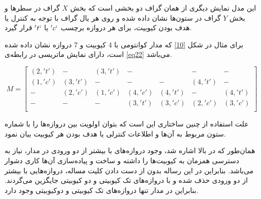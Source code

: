این مدل نمایش دیگری از همان گراف دو بخشی است که بخش $X$ گراف در سطرها و بخش $Y$ گراف در ستون‌ها نشان داده شده و روی هر یال گراف با توجه به کنترل یا هدف بودن کیوبیت، برای هر دروازه برچسب $'c`$ یا $'t`$ قرار گیرد.

برای مثال در شکل \ref{10} که مدار کوانتومی با 4 کیوبیت و 7 دروازه نشان داده شده است، دارای نمایش ماتریسی در رابطه‌ی \eqref{eq22} می‌باشد.




\begin{equation}
M=
\begin{bmatrix}
(2,'t')&-&(3,'t')&-&&-&-\\
(1,'c')&(3,'t')&-&-&-&(4,'t')&-\\
-&(2,'c')&(1,'c')&(4,'c')&(4,'t')&-&(4,'t')\\
-&-&-&(3,'t')&(3,'c')&(2,'c')&(3,'c')\\
\end{bmatrix}
\label{eq22}
\end{equation}



علت استفاده از چنین ساختاری این است که بتوان اولویت بین دروازه‌ها را با شماره ستون مربوط به آن‌ها و اطلاعات کنترلی یا هدف بودن هر کیوبیت بیان نمود.


همان‌طور که در بالا اشاره شد، وجود دروازه‌های با بیشتر از دو ورودی در مدار، نیاز به دسترسی همزمان به کیوبیت‌ها را داشته و ساخت و پیاده‌سازی آن‌ها کاری دشوار می‌باشد. بنابراین در این رساله بدون از دست دادن کلیت مساله، دروازه‌هایی با بیشتر از دو ورودی حذف شده  و با دروازه‌های تک کیوبیتی و دو کیوبیتی جایگزین می‌گردند. بنابراین در مدار تنها دروازه‌های تک کیوبیتی و  دوکیوبیتی وجود دارد.


